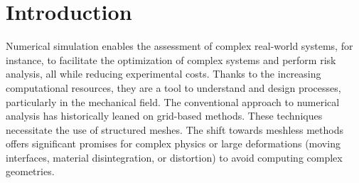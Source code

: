 
\section{Introduction}






Numerical simulation enables the assessment of complex real-world systems, for instance, to facilitate the optimization of complex systems and perform risk analysis, all while reducing experimental costs. Thanks to the increasing computational resources, they are a tool to understand and design processes, particularly in the mechanical field.
The conventional approach to numerical analysis has historically leaned on grid-based methods. These techniques necessitate the use of structured meshes. The shift towards meshless methods offers significant promises for complex physics or large deformations (moving interfaces, material disintegration, or distortion) to avoid computing complex geometries.

